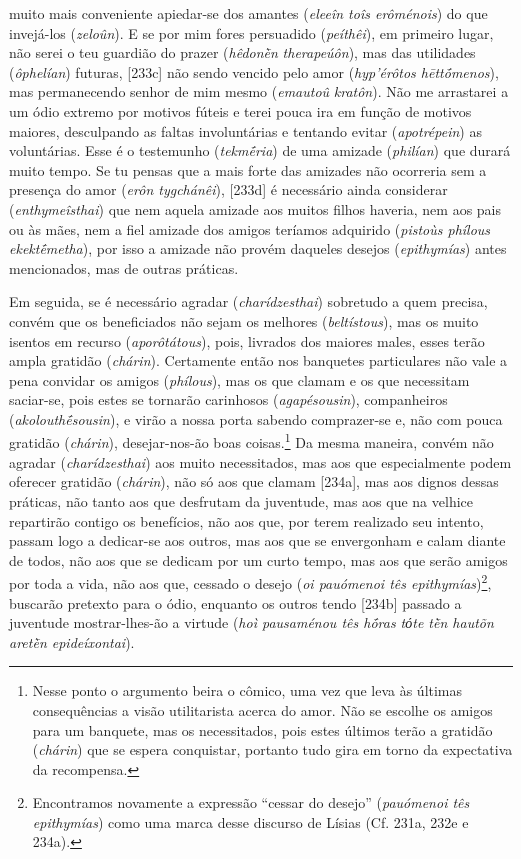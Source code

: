 muito mais conveniente apiedar-se dos amantes (\emph{eleeîn toîs
erôménois}) do que invejá-los (\emph{zeloûn}). E se por mim fores
persuadido (\emph{peíthêi}), em primeiro lugar, não serei o teu guardião
do prazer (\emph{hêdonḕn} \emph{therapeúôn}), mas das utilidades
(\emph{ôphelían}) futuras, {[}233c{]} não sendo vencido pelo amor
(\emph{hyp'érôtos hēttṓmenos}), mas permanecendo senhor de mim mesmo
(\emph{emautoû} \emph{kratôn}). Não me arrastarei a um ódio extremo por
motivos fúteis e terei pouca ira em função de motivos maiores,
desculpando as faltas involuntárias e tentando evitar
(\emph{apotrépein}) as voluntárias. Esse é o testemunho
(\emph{tekmḗria}) de uma amizade (\emph{philían}) que durará muito
tempo. Se tu pensas que a mais forte das amizades não ocorreria sem a
presença do amor (\emph{erôn tygchánêi}), {[}233d{]} é necessário ainda
considerar (\emph{enthymeîsthai}) que nem aquela amizade aos muitos
filhos haveria, nem aos pais ou às mães, nem a fiel amizade dos amigos
teríamos adquirido (\emph{pistoùs phílous ekektḗmetha}), por isso a
amizade não provém daqueles desejos (\emph{epithymías}) antes
mencionados, mas de outras práticas.

Em seguida, se é necessário agradar (\emph{charídzesthai}) sobretudo a
quem precisa, convém que os beneficiados não sejam os melhores
(\emph{beltístous}), mas os muito isentos em recurso
(\emph{aporôtátous}), pois, livrados dos maiores males, esses terão
ampla gratidão (\emph{chárin}). Certamente então nos banquetes
particulares não vale a pena convidar os amigos (\emph{phílous}), mas os
que clamam e os que necessitam saciar-se, pois estes se tornarão
carinhosos (\emph{agapésousin}), companheiros (\emph{akolouthḗsousin}),
e virão a nossa porta sabendo comprazer-se e, não com pouca gratidão
(\emph{chárin}), desejar-nos-ão boas coisas.\footnote{Nesse ponto o
  argumento beira o cômico, uma vez que leva às últimas consequências a
  visão utilitarista acerca do amor. Não se escolhe os amigos para um
  banquete, mas os necessitados, pois estes últimos terão a gratidão
  (\emph{chárin}) que se espera conquistar, portanto tudo gira em torno
  da expectativa da recompensa.} Da mesma maneira, convém não agradar
(\emph{charídzesthai}) aos muito necessitados, mas aos que especialmente
podem oferecer gratidão (\emph{chárin}), não só aos que clamam
{[}234a{]}, mas aos dignos dessas práticas, não tanto aos que desfrutam
da juventude, mas aos que na velhice repartirão contigo os benefícios,
não aos que, por terem realizado seu intento, passam logo a dedicar-se
aos outros, mas aos que se envergonham e calam diante de todos, não aos
que se dedicam por um curto tempo, mas aos que serão amigos por toda a
vida, não aos que, cessado o desejo (\emph{oi pauómenoi tês
epithymías})\footnote{Encontramos novamente a expressão ``cessar do
  desejo'' (\emph{pauómenoi tês epithymías}) como uma marca desse
  discurso de Lísias (Cf. 231a, 232e e 234a).}, buscarão pretexto para o
ódio, enquanto os outros tendo {[}234b{]} passado a juventude
mostrar-lhes-ão a virtude (\emph{hoì pausaménou tês hṓras tόte tḕn
hautõn aretḕn epideíxontai}).

